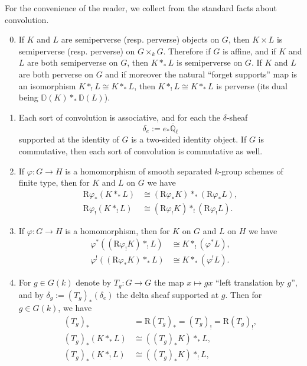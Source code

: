 For the convenience of the reader, we collect from \cite[8.1.9--10]{Ka-ESDE}
the standard facts about convolution.
\begin{enumerate}[label=(\arabic*)]
\setcounter{enumi}{-1}
\item If \(K\) and \(L\) are semiperverse (resp. perverse) objects on \(G\),
then \(K\times L\) is semiperverse (resp. perverse) on \(G\times_kG\).
Therefore if \(G\) is affine, and if \(K\) and \(L\) are both semiperverse on
\(G\), then \(K*_*L\) is semiperverse on \(G\). If \(K\) and \(L\) are both
perverse on \(G\) and if moreover the natural ``forget supports'' map is an
isomorphism \(K*_!L\cong K*_*L\), then \(K*_!L\cong K*_*L\) is perverse (its
dual being \(\mathbb{D}(K)*_*\mathbb{D}(L)\)).
\item Each sort of convolution is associative, and for each the
\(\delta\)-sheaf
\[
  \delta_e:=e_*\overline{\mathbb{Q}}_\ell
\]
supported at the identity of \(G\) is a two-sided identity object. If \(G\) is
commutative, then each sort of convolution is commutative as well.
\item[(2a)] If \(\varphi:G\to H\) is a homomorphism of smooth separated
\(k\)-group schemes of finite type, then for \(K\) and \(L\) on \(G\) we have
\[
\begin{aligned}
  \mathrm{R}\varphi_*(K*_*L)
  &\cong(\mathrm{R}\varphi_*K)*_*(\mathrm{R}\varphi_*L),\\
  \mathrm{R}\varphi_!(K*_!L)
  &\cong(\mathrm{R}\varphi_!K)*_!(\mathrm{R}\varphi_!L).
\end{aligned}
\]
\item[(2b)] If \(\varphi:G\to H\) is a homomorphism, then for \(K\) on \(G\)
and \(L\) on \(H\) we have
\[
\begin{aligned}
  \varphi^*((\mathrm{R}\varphi_!K)*_!L)
  &\cong K*_!(\varphi^*L),\\
  \varphi^!((\mathrm{R}\varphi_*K)*_*L)
  &\cong K*_*(\varphi^!L).
\end{aligned}
\]
\setcounter{enumi}{2}
\item For \(g\in G(k)\) denote by \(T_g:G\to G\) the map
\(x\mapsto gx\) ``left translation by \(g\)'', and by
\(\delta_g:=(T_g)_*(\delta_e)\) the delta sheaf supported at \(g\). Then for
\(g\in G(k)\), we have
\[
\begin{aligned}
  (T_g)_*&=\mathrm{R}(T_g)_*=(T_g)_!=\mathrm{R}(T_g)_!,\\
  (T_g)_*(K*_*L)&\cong((T_g)_*K)*_*L,\\
  (T_g)_*(K*_!L)&\cong((T_g)_*K)*_!L,\\

\end{aligned}\]
\end{enumerate}
